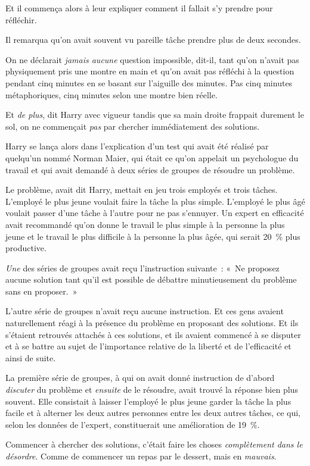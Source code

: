 Et il commença alors à leur expliquer comment il fallait s'y prendre pour réfléchir.

Il remarqua qu'on avait souvent vu pareille tâche prendre plus de deux secondes.

On ne déclarait \emph{jamais aucune} question impossible, dit-il, tant qu'on n'avait pas physiquement pris une montre en main et qu'on avait pas réfléchi à la question pendant cinq minutes en se basant sur l'aiguille des minutes.
Pas cinq minutes métaphoriques, cinq minutes selon une montre bien réelle.

Et \emph{de plus}, dit Harry avec vigueur tandis que sa main droite frappait durement le sol, on ne commençait \emph{pas} par chercher immédiatement des solutions.

Harry se lança alors dans l'explication d'un test qui avait été réalisé par quelqu'un nommé Norman Maier, qui était ce qu'on appelait un psychologue du travail et qui avait demandé à deux séries de groupes de résoudre un problème.

Le problème, avait dit Harry, mettait en jeu trois employés et trois tâches.
L'employé le plus jeune voulait faire la tâche la plus simple.
L'employé le plus âgé voulait passer d'une tâche à l'autre pour ne pas s'ennuyer.
Un expert en efficacité avait recommandé qu'on donne le travail le plus simple à la personne la plus jeune et le travail le plus difficile à la personne la plus âgée, qui serait 20~\% plus productive.

\emph{Une} des séries de groupes avait reçu l'instruction suivante~: «~Ne proposez aucune solution tant qu'il est possible de débattre minutieusement du problème sans en proposer.~»

L'autre série de groupes n'avait reçu aucune instruction.
Et ces gens avaient naturellement réagi à la présence du problème en proposant des solutions.
Et ils s'étaient retrouvés attachés à ces solutions, et ils avaient commencé à se disputer et à se battre au sujet de l'importance relative de la liberté et de l'efficacité et ainsi de suite.

La première série de groupes, à qui on avait donné instruction de d'abord \emph{discuter} du problème et \emph{ensuite} de le résoudre, avait trouvé la réponse bien plus souvent.
Elle consistait à laisser l'employé le plus jeune garder la tâche la plus facile et à alterner les deux autres personnes entre les deux autres tâches, ce qui, selon les données de l'expert, constituerait une amélioration de 19~\%.

Commencer à chercher des solutions, c'était faire les choses \emph{complètement dans le désordre}.
Comme de commencer un repas par le dessert, mais en \emph{mauvais}.

